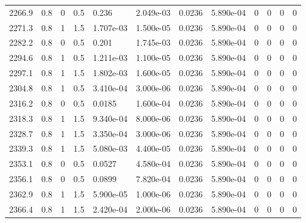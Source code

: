 \documentclass[preview]{standalone}
\begin{document}
{{{{{{{{{{\begin{tabular}{L{1.2cm}C{1.2cm} C{0.3cm}C{0.5cm} C{1.4cm}C{1.4cm} C{1.4cm}C{1.4cm} C{1.6cm}C{1.6cm} C{1.6cm}C{1.6cm}}
  2266.9  &   0.8  & 0     & 0.5 &  0.236  & 2.049e-03  &  0.0236&   5.890e-04& 0 & 0   &  0 & 0  \\ 
  2271.3  &   0.8  & 1     & 1.5 &  1.707e-03  & 1.500e-05  &  0.0236&   5.890e-04& 0 & 0   &  0 & 0  \\ 
  2282.2  &   0.8  & 0     & 0.5 &  0.201  & 1.745e-03  &  0.0236&   5.890e-04& 0 & 0   &  0 & 0  \\ 
  2294.6  &   0.8  & 1     & 0.5 &  1.211e-03  & 1.100e-05  &  0.0236&   5.890e-04& 0 & 0   &  0 & 0  \\ 
  2297.1  &   0.8  & 1     & 1.5 &  1.802e-03  & 1.600e-05  &  0.0236&   5.890e-04& 0 & 0   &  0 & 0  \\ 
  2304.8  &   0.8  & 1     & 0.5 &  3.410e-04  & 3.000e-06  &  0.0236&   5.890e-04& 0 & 0   &  0 & 0  \\ 
  2316.2  &   0.8  & 0     & 0.5 &  0.0185  & 1.600e-04  &  0.0236&   5.890e-04& 0 & 0   &  0 & 0  \\ 
  2318.3  &   0.8  & 1     & 1.5 &  9.340e-04  & 8.000e-06  &  0.0236&   5.890e-04& 0 & 0   &  0 & 0  \\ 
  2328.7  &   0.8  & 1     & 1.5 &  3.350e-04  & 3.000e-06  &  0.0236&   5.890e-04& 0 & 0   &  0 & 0  \\ 
  2339.3  &   0.8  & 1     & 1.5 &  5.080e-03  & 4.400e-05  &  0.0236&   5.890e-04& 0 & 0   &  0 & 0  \\ 
  2353.1  &   0.8  & 0     & 0.5 &  0.0527  & 4.580e-04  &  0.0236&   5.890e-04& 0 & 0   &  0 & 0  \\ 
  2356.1  &   0.8  & 0     & 0.5 &  0.0899  & 7.820e-04  &  0.0236&   5.890e-04& 0 & 0   &  0 & 0  \\ 
  2362.9  &   0.8  & 1     & 1.5 &  5.900e-05  & 1.000e-06  &  0.0236&   5.890e-04& 0 & 0   &  0 & 0  \\ 
  2366.4  &   0.8  & 1     & 1.5 &  2.420e-04  & 2.000e-06  &  0.0236&   5.890e-04& 0 & 0   &  0 & 0  \\ 
\hline 
\end{tabular} 

}}}}}}}}}}
\end{document}
